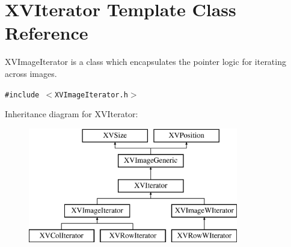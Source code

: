\hypertarget{class_XVIterator}{
\section{XVIterator  Template Class Reference}
\label{XVIterator}
}
XVImage\-Iterator is a class which encapsulates the pointer logic for iterating across images. 


{\tt \#include $<$XVImage\-Iterator.h$>$}

Inheritance diagram for XVIterator:\begin{figure}[H]
\begin{center}
\leavevmode
\includegraphics[height=5cm]{class_XVIterator}
\end{center}
\end{figure}
